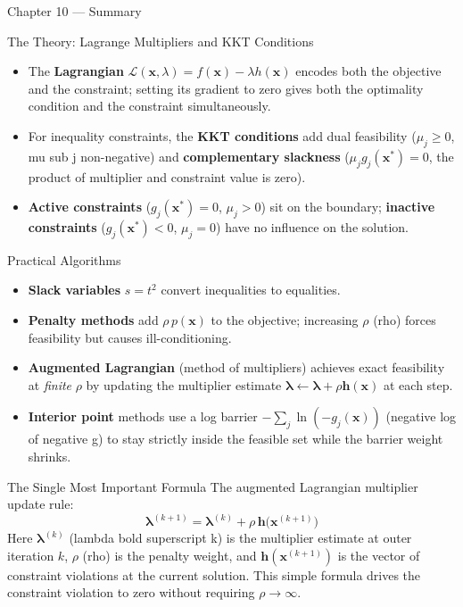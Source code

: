 \documentclass[aspectratio=169,10pt]{beamer}
\newcommand{\bx}{\mathbf{x}}
\newcommand{\blambda}{\bm{\lambda}}
\newcommand{\Lagr}{\mathcal{L}}
\begin{document}
\begin{frame}[allowframebreaks]{Chapter 10 --- Summary}
\begin{block}{The Theory: Lagrange Multipliers and KKT Conditions}
\begin{itemize}
      \item The \textbf{Lagrangian} $\Lagr(\bx, \lambda) = f(\bx) - \lambda h(\bx)$
            encodes both the objective and the constraint; setting its gradient to
            zero gives both the optimality condition and the constraint simultaneously.

      \item For inequality constraints, the \textbf{KKT conditions} add dual
            feasibility ($\mu_j \ge 0$, mu sub j non-negative) and
            \textbf{complementary slackness} ($\mu_j g_j(\bx^*) = 0$, the
            product of multiplier and constraint value is zero).

      \item \textbf{Active constraints} ($g_j(\bx^*) = 0$, $\mu_j > 0$) sit on
            the boundary; \textbf{inactive constraints} ($g_j(\bx^*) < 0$,
            $\mu_j = 0$) have no influence on the solution.
    \end{itemize}
  \end{block}

  \begin{block}{Practical Algorithms}
    \begin{itemize}
      \item \textbf{Slack variables} $s = t^2$ convert inequalities to equalities.
      \item \textbf{Penalty methods} add $\rho\, p(\bx)$ to the objective;
            increasing $\rho$ (rho) forces feasibility but causes ill-conditioning.
      \item \textbf{Augmented Lagrangian} (method of multipliers) achieves exact
            feasibility at \emph{finite} $\rho$ by updating the multiplier estimate
            $\blambda \leftarrow \blambda + \rho \mathbf{h}(\bx)$ at each step.
      \item \textbf{Interior point} methods use a log barrier
            $-\sum_j \ln(-g_j(\bx))$ (negative log of negative g) to stay
            strictly inside the feasible set while the barrier weight shrinks.
    \end{itemize}
  \end{block}

  \begin{alertblock}{The Single Most Important Formula}
    The augmented Lagrangian multiplier update rule:
    \[
      \blambda^{(k+1)} = \blambda^{(k)} + \rho\,\mathbf{h}\!\bigl(\bx^{(k+1)}\bigr)
    \]
    Here $\blambda^{(k)}$ (lambda bold superscript k) is the multiplier estimate
    at outer iteration $k$, $\rho$ (rho) is the penalty weight, and
    $\mathbf{h}(\bx^{(k+1)})$ is the vector of constraint violations at the
    current solution.  This simple formula drives the constraint violation to
    zero without requiring $\rho \to \infty$.
  \end{alertblock}

\end{frame}
\end{document}
